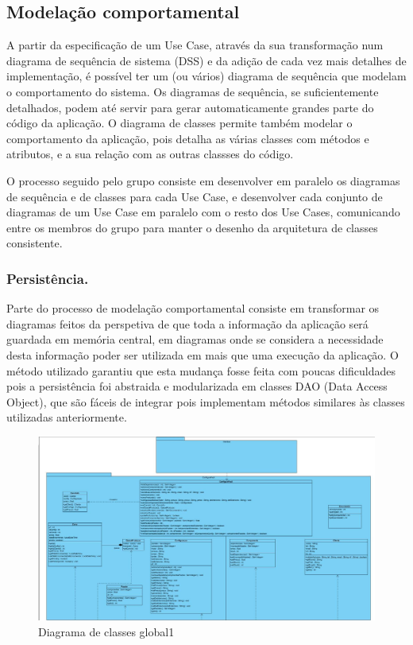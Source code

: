 \documentclass{llncs}
\newcommand\tab[1][0.5cm]{\hspace*{#1}}
\begin{document}
\subsection{Modelação comportamental}

A partir da especificação de um Use Case, através da sua transformação num diagrama de sequência de sistema (DSS) e da adição de cada vez mais detalhes de implementação, é possível ter um (ou vários) diagrama de sequência que modelam o comportamento do sistema. Os diagramas de sequência, se suficientemente detalhados, podem até servir para gerar automaticamente grandes parte do código da aplicação. O diagrama de classes permite também modelar o comportamento da aplicação, pois detalha as várias classes com métodos e atributos, e a sua relação com as outras classses do código.

\tab O processo seguido pelo grupo consiste em desenvolver em paralelo os diagramas de sequência e de classes para cada Use Case, e desenvolver cada conjunto de diagramas de um Use Case em paralelo com o resto dos Use Cases, comunicando entre os membros do grupo para manter o desenho da arquitetura de classes consistente.

\subsubsection{Persistência.} %

Parte do processo de modelação comportamental consiste em transformar os diagramas feitos da perspetiva de que toda a informação da aplicação será guardada em memória central, em diagramas onde se considera a necessidade desta informação poder ser utilizada em mais que uma execução da aplicação. O método utilizado garantiu que esta mudança fosse feita com poucas dificuldades pois a persistência foi abstraida e modularizada em classes DAO (Data Access Object), que são fáceis de integrar pois implementam métodos similares às classes utilizadas anteriormente.

\begin{figure}
\begin{center}
\includegraphics[scale=0.33]{diagrama_classes_global1.jpg}
\end{center}
\caption{\label{fig:diagrama_classes_global1}Diagrama de classes global1}
\end{figure}
\end{document}
